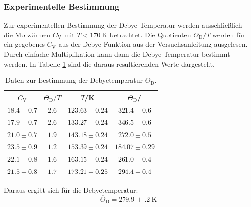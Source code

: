 \subsubsection{Experimentelle Bestimmung}
Zur experimentellen Bestimmung der Debye-Temperatur werden ausschließlich die Molwärmen $C_\mathrm{V}$ mit $T<\SI{170}{\kelvin}$ betrachtet.
Die Quotienten $\Theta_\mathrm{D} / T$ werden für ein gegebenes $C_\mathrm{V}$ aus der Debye-Funktion aus der Versuchsanleitung \cite[2,3]{Anleitung} ausgelesen.
Durch einfache Multiplikation kann dann die Debye-Temperatur bestimmt werden. In Tabelle \ref{tab:tab3} sind die daraus resultierenden Werte dargestellt.
\begin{table}
  \centering
  \caption{Daten zur Bestimmung der Debyetemperatur $\Theta_\mathrm{D}$.}
  \label{tab:tab3}
  \begin{tabular}{c c c c}
    \toprule
		$C_\mathrm{V}$ & $\Theta_\mathrm{D} / T$ & $T$/K & $\Theta_\mathrm{D}$/ \\
    \midrule
    $18.4\pm0.7$ & $2.6$ & $123.63\pm0.24$ & $321.4\pm0.6$ \\
    $17.9\pm0.7$ & $2.6$ & $133.27\pm0.24$ & $346.5\pm0.6$ \\
    $21.0\pm0.7$ & $1.9$ & $143.18\pm0.24$ & $272.0\pm0.5$ \\
    $23.5\pm0.9$ & $1.2$ & $153.39\pm0.24$ & $184.07\pm0.29$ \\
    $22.1\pm0.8$ & $1.6$ & $163.15\pm0.24$ & $261.0\pm0.4$ \\
    $21.5\pm0.8$ & $1.7$ & $173.21\pm0.25$ & $294.4\pm0.4$ \\
    \bottomrule
  \end{tabular}
\end{table}
\FloatBarrier
\noindent Daraus ergibt sich für die Debyetemperatur:
\begin{equation*}
  \overline{\Theta}_\mathrm{D}=\SI{279.9(2)}{\kelvin}
\end{equation*}

